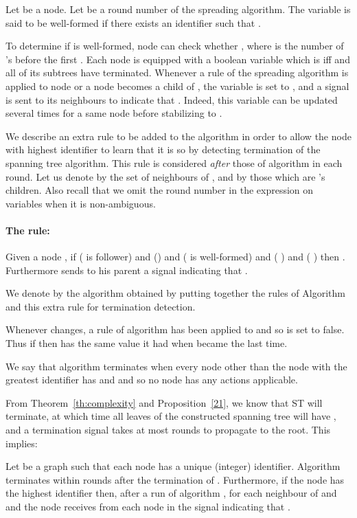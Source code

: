 \documentclass[11pt,envcountsame,letterpaper]{llncs}
\begin{document}
\begin{definition}
Let  be a node. Let  be a round number of the spreading
algorithm. The variable  is said to be
well-formed if there exists an identifier 
 such that .
\end{definition}

To determine if  is well-formed, node  can check whether , where  is the number of 's before the first .
Each node  is equipped with a boolean variable 
 which is  iff  and all of its subtrees have terminated.
Whenever a rule of the spreading algorithm is applied to node 
or a node  becomes a child of ,
the variable  is set to , and a signal is sent to its 
neighbours to indicate that . Indeed, this variable can be updated
several times for a same node before stabilizing to . 

We describe an extra rule to be added to the 
 algorithm in order to allow the node
with highest identifier to learn that it is so by detecting
termination of the spanning tree  algorithm.
This rule is considered {\em after} those of algorithm  in each round.
Let us denote by  the set of neighbours of , and by  those which are 's children. Also recall that we omit the round number in the expression on variables when it is non-ambiguous.

\paragraph{The rule:} Given a node , if ( is follower) and ()
and ( is well-formed)
and ( ) and ( )
then .
Furthermore  sends to his parent a signal indicating that .


We denote by \STT
 the algorithm obtained  by putting  together the rules
 of Algorithm  and this extra rule for termination detection.

Whenever  changes, a rule of algorithm  has been applied to 
 and so  is set to false. Thus
if   then  has the same value  it had when 
became  the last time.

We say that algorithm \STT terminates when every node  other than the node 
with the greatest identifier has  and  and so
no node has any actions applicable.

From Theorem~\ref{th:complexity} and Proposition~\ref{21}, we know that ST will terminate, at which time all leaves of the constructed spanning tree will have , and a termination signal takes at most  rounds to propagate to the root. This implies:
\begin{proposition}
  \label{prop:STTterm}
Let  be a graph such that each node has a unique (integer) identifier. 
Algorithm \STT terminates within  rounds after the termination of . Furthermore,
if the node  has the highest identifier then,  after a run of 
algorithm \STT,  for each neighbour  of 
   and  and 
the node  receives from each node  in  the signal 
indicating that .
\end{proposition}
\end{document}
